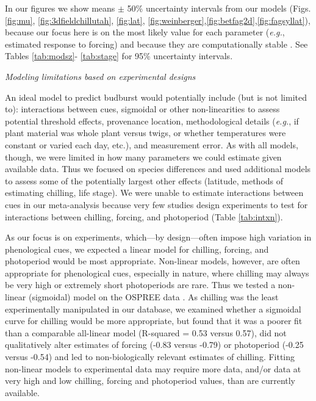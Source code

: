 \documentclass{article}
\begin{document}
In our figures  we show means $\pm$ 50\% uncertainty intervals from our models (Figs. \ref{fig:mu}, \ref{fig:3dfieldchillutah}, \ref{fig:lat}, \ref{fig:weinberger},\ref{fig:betfag2d},\ref{fig:fagsyllat}), because our focus here is on the most likely value for each parameter (\emph{e.g.}, estimated response to forcing) and because they are computationally stable \emph{\citep{Carpenter:2016aa,BDA}}. See Tables \ref{tab:modsz}- \ref{tab:stage} for 95\% uncertainty intervals. 

\noindent \emph{Modeling limitations based on experimental designs}
\par An ideal model to predict budburst would potentially include (but is not limited to): interactions between cues, sigmoidal or other non-linearities to assess potential threshold effects, provenance location, methodological details (\emph{e.g.}, if plant material was whole plant versus twigs, or whether temperatures were constant or varied each day, etc.), and measurement error. As with all models, though, we were limited in how many parameters we could estimate given available data. Thus we focused on species differences and used additional models to assess some of the potentially largest other effects (latitude, methods of estimating chilling, life stage). We were unable to estimate interactions between cues in our meta-analysis because very few studies design experiments to test for interactions between chilling, forcing, and photoperiod (Table \ref{tab:intxn}). 
\par As our focus is on experiments, which---by design---often impose high variation in phenological cues, we expected a linear model for chilling, forcing, and photoperiod would be most appropriate. Non-linear models, however, are often appropriate for phenological cues, especially in nature, where chilling may always be very high or extremely short photoperiods are rare. Thus we tested a non-linear (sigmoidal) model on the OSPREE data \emph{\citep{pmp}}. As chilling was the least experimentally manipulated in our database, we examined whether a sigmoidal curve for chilling would be more appropriate, but found that it was a poorer fit than a comparable all-linear model (R-squared = 0.53 versus 0.57), did not qualitatively alter estimates of forcing (-0.83 versus -0.79) or photoperiod (-0.25 versus -0.54) and led to non-biologically relevant estimates of chilling. Fitting non-linear models to experimental data may require more data, and/or data at very high and low chilling, forcing and photoperiod values, than are currently available. 
\end{document}
